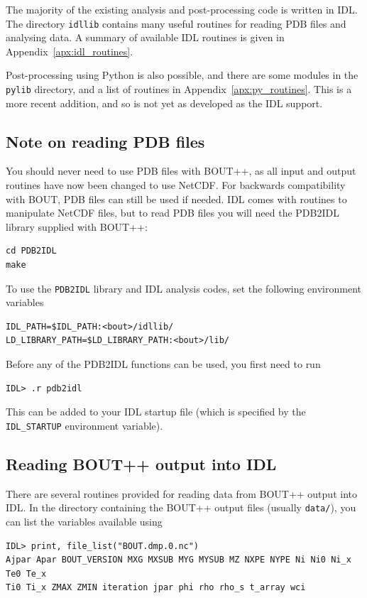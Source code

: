\documentclass[12pt]{article}
\newcommand{\code}[1]{\texttt{#1}}
\begin{document}
The majority of the existing analysis and post-processing code is written
in IDL. The directory \texttt{idllib} contains many useful routines for
reading PDB files and analysing data. A summary of available IDL routines
is given in Appendix~\ref{apx:idl_routines}.

Post-processing using Python is also possible, and there are some modules
in the \texttt{pylib} directory, and a list of routines in Appendix~\ref{apx:py_routines}.
This is a more recent addition, and so is not yet as developed as the IDL support.



\subsection{Note on reading PDB files}

You should never need to use PDB files with BOUT++, as all input and output routines have now
been changed to use NetCDF. For backwards compatibility with BOUT, PDB files can still be used
if needed. IDL comes with routines to manipulate NetCDF files, but to read PDB files you will need the PDB2IDL library
supplied with BOUT++:
\begin{verbatim}
cd PDB2IDL
make
\end{verbatim}
To use the \code{PDB2IDL} library and IDL analysis codes, set the following environment variables
\begin{verbatim}
IDL_PATH=$IDL_PATH:<bout>/idllib/
LD_LIBRARY_PATH=$LD_LIBRARY_PATH:<bout>/lib/
\end{verbatim}
Before any of the PDB2IDL functions can be used, you first need to run
\begin{verbatim}
IDL> .r pdb2idl
\end{verbatim}
This can be added to your IDL startup file (which is specified by the
\code{IDL\_STARTUP} environment variable).

\subsection{Reading BOUT++ output into IDL}
There are several routines provided for reading data from BOUT++ output into
IDL. In the directory containing the BOUT++ output files
(usually \texttt{data/}), you can list the variables available using
\begin{verbatim}
IDL> print, file_list("BOUT.dmp.0.nc")
Ajpar Apar BOUT_VERSION MXG MXSUB MYG MYSUB MZ NXPE NYPE Ni Ni0 Ni_x Te0 Te_x
Ti0 Ti_x ZMAX ZMIN iteration jpar phi rho rho_s t_array wci
\end{verbatim}
\end{document}

